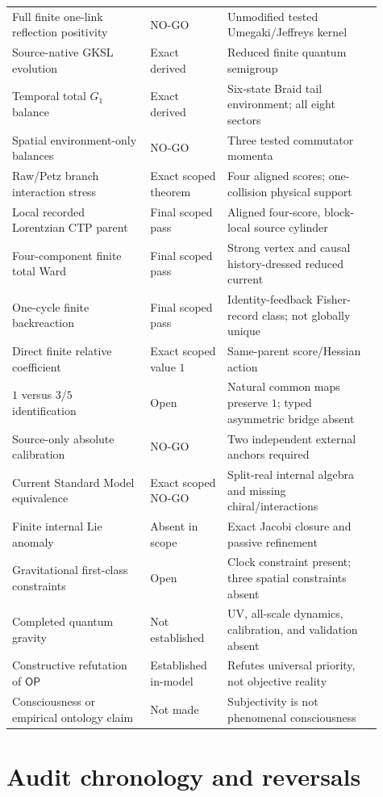 \documentclass[11pt]{article}
\theoremstyle{definition}
\theoremstyle{remark}
\newcommand{\OPT}{\mathsf{OP}}
\begin{document}
\begin{longtable}{>{\raggedright\arraybackslash}p{0.34\linewidth} >{\raggedright\arraybackslash}p{0.19\linewidth} >{\raggedright\arraybackslash}p{0.38\linewidth}}
Full finite one-link reflection positivity & NO-GO & Unmodified tested Umegaki/Jeffreys kernel \\
Source-native GKSL evolution & Exact derived & Reduced finite quantum semigroup \\
Temporal total $G_1$ balance & Exact derived & Six-state Braid tail environment; all eight sectors \\
Spatial environment-only balances & NO-GO & Three tested commutator momenta \\
Raw/Petz branch interaction stress & Exact scoped theorem & Four aligned scores; one-collision physical support \\
Local recorded Lorentzian CTP parent & Final scoped pass & Aligned four-score, block-local source cylinder \\
Four-component finite total Ward & Final scoped pass & Strong vertex and causal history-dressed reduced current \\
One-cycle finite backreaction & Final scoped pass & Identity-feedback Fisher-record class; not globally unique \\
Direct finite relative coefficient & Exact scoped value $1$ & Same-parent score/Hessian action \\
$1$ versus $3/5$ identification & Open & Natural common maps preserve $1$; typed asymmetric bridge absent \\
Source-only absolute calibration & NO-GO & Two independent external anchors required \\
Current Standard Model equivalence & Exact scoped NO-GO & Split-real internal algebra and missing chiral/interactions \\
Finite internal Lie anomaly & Absent in scope & Exact Jacobi closure and passive refinement \\
Gravitational first-class constraints & Open & Clock constraint present; three spatial constraints absent \\
Completed quantum gravity & Not established & UV, all-scale dynamics, calibration, and validation absent \\
Constructive refutation of $\OPT$ & Established in-model & Refutes universal priority, not objective reality \\
Consciousness or empirical ontology claim & Not made & Subjectivity is not phenomenal consciousness \\
\bottomrule
\end{longtable}

\section{Audit chronology and reversals}
\end{document}
